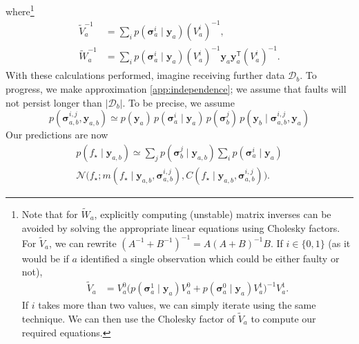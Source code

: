 \documentclass[twoside]{article}
\newcommand{\deq}{=}
\newcommand{\given}{\!\ensuremath{\mid}\!}
\newcommand{\cm}[1]{\ensuremath{\mathcal{#1}}}
\newcommand{\bm}[1]{\ensuremath{\mathbf{#1}}}
\newcommand{\data}{\ensuremath{\cm{D}}}
\newcommand{\vect}[1]{\bm{#1}}
\newcommand{\vy}{\vect{y}}
\newcommand{\vs}{\vect{\sigma}}
\newcommand{\amean}[2]{\tilde{{m}}(#1 \given #2 )}
\newcommand{\acov}[2]{\tilde{{C}}(#1 \given #2 )}
\newcommand{\p}[2]{p(#1\given#2)}
\newcommand{\fPr}{p}
\newcommand{\Prob}[2]{\fPr(#1 \given #2 )}
\newcommand{\mean}[2]{{m}(#1\given#2)}
\newcommand{\cov}[2]{{C}(#1\given#2)}
\newcommand{\st}{_{\star}}
\newcommand{\tr}{\ensuremath{\mathsf{T}}}
\DeclareMathOperator{\chol}{chol}
\begin{document}
where\footnote{
Note that for $\tilde{W}_a$, explicitly computing (unstable) matrix
inverses can be avoided by solving the appropriate linear equations
using Cholesky factors.  For $\tilde{V}_a$, we can rewrite
$(A^{-1}+B^{-1})^{-1} = A (A+B)^{-1} B$. If $i\in\{0,1\}$ (as it would
be if $a$ identified a single observation which could be either faulty
or not),
\begin{align} \label{eq:inverse_trick}
\tilde{V}_a & = V^0_a\bigl(
\Prob{\vs^1_{a}}{\vy_a} V^0_a 
+ 
\Prob{\vs^0_{a}}{\vy_a} V^1_a
\bigr)^{-1}V^1_a.
\end{align}
If $i$ takes more than two values, we can simply iterate using the
same technique. We can then use the Cholesky factor of $\tilde{V}_a$ to compute our required equations.}
\begin{align}
 \tilde{V}_a^{-1}  & \deq \sum_i \Prob{\vs^i_{a}}{\vy_a} (V_a^i)^{-1},\nonumber\\
 \tilde{W}_a^{-1} & \deq \sum_i \Prob{\vs^i_{a}}{\vy_a} (V_a^i)^{-1}\vy_a \vy_a^\tr (V_a^i)^{-1}.\label{eq:Wa}
\end{align}
With these calculations performed, imagine receiving
further data $\data_b$. To progress, we make approximation \ref{app:independence}; we assume that faults will not persist longer than $|\data_b|$. To be precise, we assume
\begin{equation} \label{eq:approx}
p(\vs^{i,j}_{a,b},\vy_{a,b})  \simeq p(\vy_a)\,\Prob{\vs^i_{a}}{\vy_a}\,
p(\vs^j_{b})\,\p{\vy_b}{\vs^{i,j}_{a,b},\vy_{a}}
\end{equation}
Our predictions are now
\begin{multline}
\p{f\st}{\vy_{a,b}} %
\simeq 
\sum_{j} \Prob{\vs^j_{b}}{\vy_{a,b}}\sum_{i} \Prob{\vs^i_{a}}{\vy_a} \\
 \cm{N}\bigl(f\st; \mean{f\st}{\vy_{a,b}, \vs^{i,j}_{a,b}}, \cov{f\st}{\vy_{a,b}, \vs^{i,j}_{a,b}}\bigr).\label{eq:sum_o_Gaussians}
\end{multline}
\end{document}
